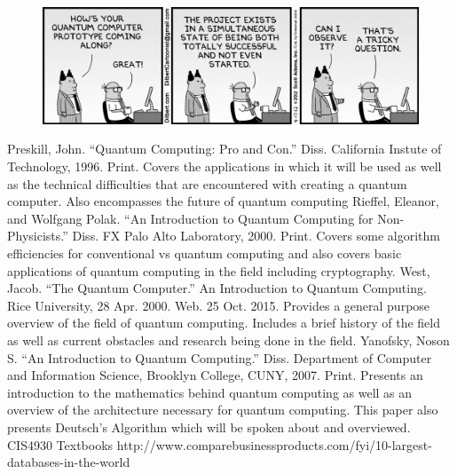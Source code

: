 \documentclass[12pt]{article}
\begin{document}
\begin{figure}
\includegraphics[scale=.5]{dilbert}
\centering
\end{figure}







\newpage

\begin{thebibliography}{1}
Preskill, John. ``Quantum Computing: Pro and Con.'' Diss. California Instute of Technology, 1996. Print. Covers the applications in which it will be used as well as the technical difficulties that are encountered with creating a quantum computer. Also encompasses the future of quantum computing
Rieffel, Eleanor, and Wolfgang Polak. ``An Introduction to Quantum Computing for Non-Physicists.'' Diss. FX Palo Alto Laboratory, 2000. Print. Covers some algorithm efficiencies for conventional vs quantum computing and also covers basic applications of quantum computing in the field including cryptography.
West, Jacob. ``The Quantum Computer.'' An Introduction to Quantum Computing. Rice University, 28 Apr. 2000. Web. 25 Oct. 2015. Provides a general purpose overview of the field of quantum computing. Includes a brief history of the field as well as current obstacles and research being done in the field.
Yanofsky, Noson S. ``An Introduction to Quantum Computing.'' Diss. Department of Computer and Information Science, Brooklyn College, CUNY, 2007. Print. Presents an introduction to the mathematics behind quantum computing as well as an overview of the architecture necessary for quantum computing. This paper also presents Deutsch's Algorithm which will be spoken about and overviewed.
CIS4930 Textbooks
http://www.comparebusinessproducts.com/fyi/10-largest-databases-in-the-world
\end{thebibliography}

\clearpage
\end{document}

